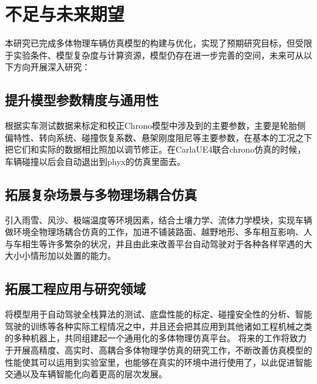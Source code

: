 \section{不足与未来期望}
本研究已完成多体物理车辆仿真模型的构建与优化，实现了预期研究目标，但受限于实验条件、模型复杂度与计算资源，模型仍存在进一步完善的空间，未来可从以下方向开展深入研究：
\subsection{提升模型参数精度与通用性}
根据实车测试数据来标定和校正Chrono模型中涉及到的主要参数，主要是轮胎侧偏特性、转向系统、碰撞恢复系数、悬架刚度阻尼等主要参数，在基本的工况之下把它们和实际的数据相比照加以调节修正。在CarlaUE4联合chrono仿真的时候，车辆碰撞以后会自动退出到phyx的仿真里面去。
\subsection{拓展复杂场景与多物理场耦合仿真}
引入雨雪、风沙、极端温度等环境因素，结合土壤力学、流体力学模块，实现车辆做环境全物理场耦合仿真的工作，加进不铺装路面、越野地形、多车相互影响、人与车相生等许多繁杂的状况，并且由此来改善平台自动驾驶对于各种各样罕遇的大大小小情形加以处置的能力。

\subsection{拓展工程应用与研究领域}
将模型用于自动驾驶全栈算法的测试、底盘性能的标定、碰撞安全性的分析、智能驾驶的训练等各种实际工程情况之中，并且还会把其应用到其他诸如工程机械之类的多种机器上，共同组建起一个通用化的多体物理仿真平台。
将来的工作将致力于开展高精度、高实时、高耦合多体物理学仿真的研究工作，不断改善仿真模型的性能使其可以运用到实验室里，也能够在真实的环境中进行使用了，以此促进智能交通以及车辆智能化向着更高的层次发展。
\newpage